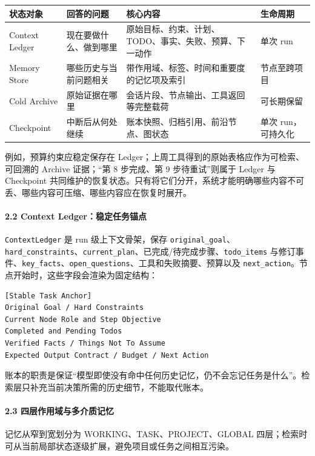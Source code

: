\documentclass[UTF8,a4paper,12pt]{ctexart}
\begin{document}
\begin{longtable}[]{@{}llll@{}}
\toprule
状态对象 & 回答的问题 & 核心内容 & 生命周期 \\
\midrule
\endhead
Context Ledger & 现在要做什么、做到哪里 & 原始目标、约束、计划、TODO、事实、失败、预算、下一动作 & 单次 run \\
Memory Store & 哪些历史与当前问题相关 & 带作用域、标签、时间和重要度的记忆项及索引 & 节点至跨项目 \\
Cold Archive & 原始证据在哪里 & 会话片段、节点输出、工具返回等完整载荷 & 可长期保留 \\
Checkpoint & 中断后从何处继续 & 账本快照、归档引用、前沿节点、图状态 & 单次 run，可持久化 \\
\bottomrule
\end{longtable}

例如，预算约束应稳定保存在 Ledger；上周工具得到的原始表格应作为可检索、可回溯的 Archive 证据；``第 8 步完成、第 9 步待重试''则属于 Ledger 与 Checkpoint 共同维护的恢复状态。只有将它们分开，系统才能明确哪些内容不可丢、哪些内容可压缩、哪些内容应在恢复时展开。

\paragraph{2.2 Context Ledger：稳定任务锚点}

\texttt{ContextLedger} 是 run 级上下文骨架，保存 \texttt{original\_goal}、\texttt{hard\_constraints}、\texttt{current\_plan}、已完成/待完成步骤、\texttt{todo\_items} 与修订事件、\texttt{key\_facts}、\texttt{open\_questions}、工具和失败摘要、预算以及 \texttt{next\_action}。节点开始时，这些字段会渲染为固定结构：

\begin{verbatim}
[Stable Task Anchor]
Original Goal / Hard Constraints
Current Node Role and Step Objective
Completed and Pending Todos
Verified Facts / Things Not To Assume
Expected Output Contract / Budget / Next Action
\end{verbatim}

账本的职责是保证``模型即使没有命中任何历史记忆，仍不会忘记任务是什么''。检索层只补充当前决策所需的历史细节，不能取代账本。

\paragraph{2.3 四层作用域与多介质记忆}

记忆从窄到宽划分为 WORKING、TASK、PROJECT、GLOBAL 四层；检索时可从当前局部状态逐级扩展，避免项目或任务之间相互污染。
\end{document}
